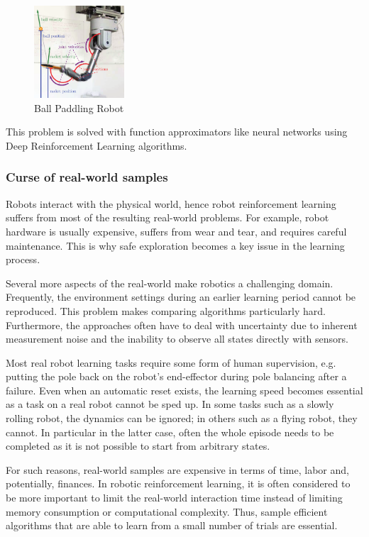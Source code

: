 \begin{figure}[H]
    \centering
    \includegraphics[width=0.3\textwidth]{Images/ball_paddling.png}
    \caption{Ball Paddling Robot}
    \label{fig:ball_paddling_robot}
\end{figure}

This problem is solved with function approximators like neural networks using Deep Reinforcement Learning algorithms.

\subsubsection{Curse of real-world samples}
Robots interact with the physical world, hence robot reinforcement learning suffers from most of the resulting real-world problems.
For example, robot hardware is usually expensive, suffers from wear and tear, and requires careful maintenance. This is why safe exploration
becomes a key issue in the learning process.

Several more aspects of the real-world make robotics a challenging domain. Frequently, the environment settings during an earlier 
learning period cannot be reproduced. This problem makes comparing algorithms particularly hard. Furthermore, the approaches often have to deal 
with uncertainty due to inherent measurement noise and the inability to observe all states directly with sensors.

Most real robot learning tasks require some form of human supervision, e.g. putting the pole back on the robot's end-effector during pole balancing
 after a failure. Even when an automatic reset exists, the learning speed becomes essential as a task on a real robot cannot be sped up.
In some tasks such as a slowly rolling robot, the dynamics can be ignored; in others such as a flying robot, they cannot. In particular in the latter case,
often the whole episode needs to be completed as it is not possible to start from arbitrary states.

For such reasons, real-world samples are expensive in terms of time, labor and, potentially, finances. In robotic reinforcement learning,
it is often considered to be more important to limit the real-world interaction time instead of limiting memory consumption or computational complexity.
Thus, sample efficient algorithms that are able to learn from a small number of trials are essential.

